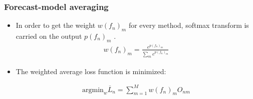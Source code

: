 \documentclass[10pt,aspectratio=43]{beamer}
\begin{document}
\begin{frame}
  \frametitle{Forecast-model averaging}
  \begin{itemize}

\item In order to get the weight $w(f_{n})_{m}$ for every method, softmax transform is carried on the output $p(f_{n})_{m}$  .
\begin{equation*}
  \begin{aligned}
   w(f_{n})_{m}=\frac{e^{p(f_{n})_{m}}}{\sum_{m}e^{p(f_{n})_{m}}}
  \end{aligned}
\end{equation*}

\item The weighted average loss function is minimized:

  \begin{equation*}
  \begin{aligned}
    \mathrm{argmin}_{w}\overline { L }_ { n }  =\sum\nolimits_{m=1}^{M}w(f_{n})_{m}O_{nm}
  \end{aligned}
\end{equation*}
\end{itemize}


\end{frame}
\end{document}
